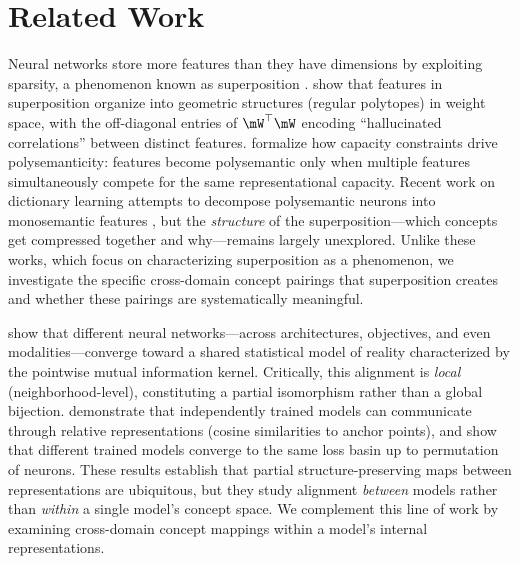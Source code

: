 \section{Related Work}
\label{sec:related}

Neural networks store more features than they have dimensions by exploiting sparsity, a phenomenon known as superposition \citep{elhage2022superposition}.
\citet{elhage2022superposition} show that features in superposition organize into geometric structures (regular polytopes) in weight space, with the off-diagonal entries of $\mW^\top\mW$ encoding ``hallucinated correlations'' between distinct features.
\citet{scherlis2022polysemanticity} formalize how capacity constraints drive polysemanticity: features become polysemantic only when multiple features simultaneously compete for the same representational capacity.
Recent work on dictionary learning attempts to decompose polysemantic neurons into monosemantic features \citep{bricken2023monosemanticity}, but the \emph{structure} of the superposition---which concepts get compressed together and why---remains largely unexplored.
Unlike these works, which focus on characterizing superposition as a phenomenon, we investigate the specific cross-domain concept pairings that superposition creates and whether these pairings are systematically meaningful.

\citet{huh2024platonic} show that different neural networks---across architectures, objectives, and even modalities---converge toward a shared statistical model of reality characterized by the pointwise mutual information kernel.
Critically, this alignment is \emph{local} (neighborhood-level), constituting a partial isomorphism rather than a global bijection.
\citet{moschella2022relative} demonstrate that independently trained models can communicate through relative representations (cosine similarities to anchor points), and \citet{ainsworth2022gitrebasin} show that different trained models converge to the same loss basin up to permutation of neurons.
These results establish that partial structure-preserving maps between representations are ubiquitous, but they study alignment \emph{between} models rather than \emph{within} a single model's concept space.
We complement this line of work by examining cross-domain concept mappings within a model's internal representations.

